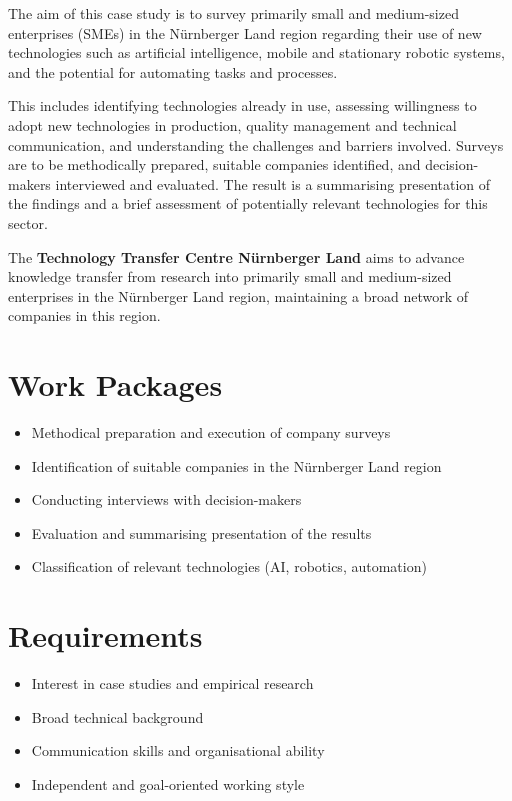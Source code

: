 \documentclass{ohm_project_description}
\begin{document}
\maketitle
\thispagestyle{fancy}

The aim of this case study is to survey primarily small and medium-sized enterprises (SMEs) in the Nürnberger Land region regarding their use of new technologies such as artificial intelligence, mobile and stationary robotic systems, and the potential for automating tasks and processes.

This includes identifying technologies already in use, assessing willingness to adopt new technologies in production, quality management and technical communication, and understanding the challenges and barriers involved. Surveys are to be methodically prepared, suitable companies identified, and decision-makers interviewed and evaluated. The result is a summarising presentation of the findings and a brief assessment of potentially relevant technologies for this sector.

The \textbf{Technology Transfer Centre Nürnberger Land} aims to advance knowledge transfer from research into primarily small and medium-sized enterprises in the Nürnberger Land region, maintaining a broad network of companies in this region.

\section*{Work Packages}
\begin{itemize}[leftmargin=0.5cm]
    \setlength\itemsep{.1em}
    \item Methodical preparation and execution of company surveys
    \item Identification of suitable companies in the Nürnberger Land region
    \item Conducting interviews with decision-makers
    \item Evaluation and summarising presentation of the results
    \item Classification of relevant technologies (AI, robotics, automation)
\end{itemize}

\section*{Requirements}
\begin{itemize}[leftmargin=0.5cm]
    \setlength\itemsep{.1em}
    \item Interest in case studies and empirical research
    \item Broad technical background
    \item Communication skills and organisational ability
    \item Independent and goal-oriented working style
\end{itemize}
\end{document}
